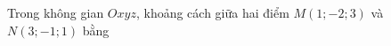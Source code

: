 \begin{ex}
Trong không gian $Oxyz$, khoảng cách giữa hai điểm $M(1;-2;3)$ và $N(3;-1;1)$ bằng
\end{ex}
